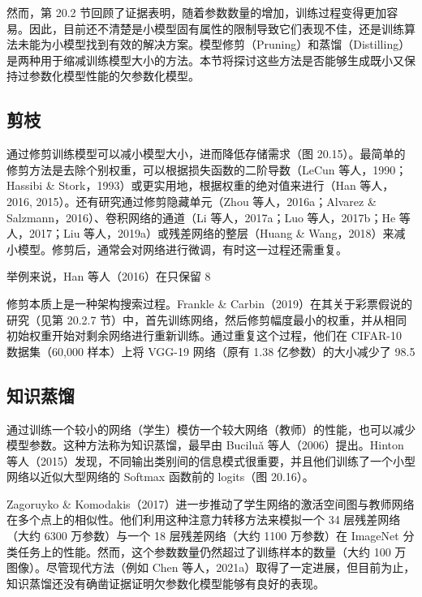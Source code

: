 然而，第 20.2 节回顾了证据表明，随着参数数量的增加，训练过程变得更加容易。因此，目前还不清楚是小模型固有属性的限制导致它们表现不佳，还是训练算法未能为小模型找到有效的解决方案。模型修剪（Pruning）和蒸馏（Distilling）是两种用于缩减训练模型大小的方法。本节将探讨这些方法是否能够生成既小又保持过参数化模型性能的欠参数化模型。

\subsection{剪枝}
通过修剪训练模型可以减小模型大小，进而降低存储需求（图 20.15）。最简单的修剪方法是去除个别权重，可以根据损失函数的二阶导数（LeCun 等人，1990；Hassibi \& Stork，1993）或更实用地，根据权重的绝对值来进行（Han 等人，2016, 2015）。还有研究通过修剪隐藏单元（Zhou 等人，2016a；Alvarez \& Salzmann，2016）、卷积网络的通道（Li 等人，2017a；Luo 等人，2017b；He 等人，2017；Liu 等人，2019a）或残差网络的整层（Huang \& Wang，2018）来减小模型。修剪后，通常会对网络进行微调，有时这一过程还需重复。

举例来说，Han 等人（2016）在只保留 8%

修剪本质上是一种架构搜索过程。Frankle \& Carbin（2019）在其关于彩票假说的研究（见第 20.2.7 节）中，首先训练网络，然后修剪幅度最小的权重，并从相同初始权重开始对剩余网络进行重新训练。通过重复这个过程，他们在 CIFAR-10 数据集（60,000 样本）上将 VGG-19 网络（原有 1.38 亿参数）的大小减少了 98.5%

\subsection{知识蒸馏}
通过训练一个较小的网络（学生）模仿一个较大网络（教师）的性能，也可以减少模型参数。这种方法称为知识蒸馏，最早由 Buciluǎ 等人（2006）提出。Hinton 等人（2015）发现，不同输出类别间的信息模式很重要，并且他们训练了一个小型网络以近似大型网络的 Softmax 函数前的 logits（图 20.16）。

Zagoruyko \& Komodakis（2017）进一步推动了学生网络的激活空间图与教师网络在多个点上的相似性。他们利用这种注意力转移方法来模拟一个 34 层残差网络（大约 6300 万参数）与一个 18 层残差网络（大约 1100 万参数）在 ImageNet 分类任务上的性能。然而，这个参数数量仍然超过了训练样本的数量（大约 100 万图像）。尽管现代方法（例如 Chen 等人，2021a）取得了一定进展，但目前为止，知识蒸馏还没有确凿证据证明欠参数化模型能够有良好的表现。

